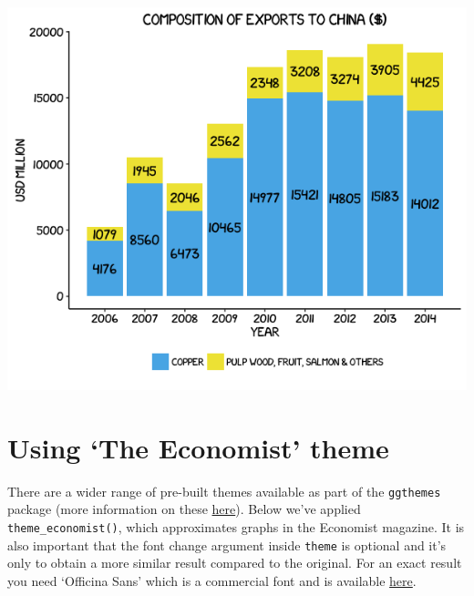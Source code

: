 \begin{Shaded}
\begin{Highlighting}[]
        \NormalTok{(}\NormalTok{, }\NormalTok{),}
        \NormalTok{, }\NormalTok{, }
         \NormalTok{(),}
         \NormalTok{(),}
         \NormalTok{(), } \NormalTok{(), }
         \NormalTok{(),}
        \NormalTok{(}\NormalTok{), }
        \NormalTok{(}\NormalTok{)) }
\end{Highlighting}
\end{Shaded}

\begin{center}\includegraphics[width=0.55\linewidth]{0_all_posts_pdf/bar_10-1} \end{center}

\section{\texorpdfstring{Using `The Economist'
theme}{Using The Economist theme}}\label{using-the-economist-theme-2}

There are a wider range of pre-built themes available as part of the
\texttt{ggthemes} package (more information on these
\href{https://cran.r-project.org/web/packages/ggthemes/vignettes/ggthemes.html}{here}).
Below we've applied \texttt{theme\_economist()}, which approximates
graphs in the Economist magazine. It is also important that the font
change argument inside \texttt{theme} is optional and it's only to
obtain a more similar result compared to the original. For an exact
result you need `Officina Sans' which is a commercial font and is
available \href{http://www.myfonts.com/fonts/itc/officina-sans/}{here}.

